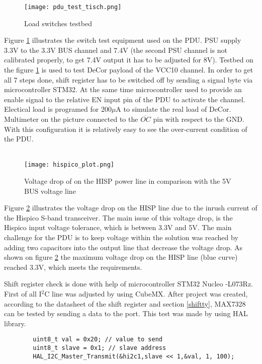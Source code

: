 \begin{figure}[h]
 	\centering
 	\texttt{[image: pdu\_test\_tisch.png]}
 	\caption{Load switches testbed}
 	\label{fig: pdu_test_tisch}
 \end{figure}

Figure \ref{fig: pdu_test_tisch} illustrates the switch test equipment used on the PDU. PSU supply 3.3V to the 3.3V BUS channel and 7.4V (the second PSU channel is not calibrated properly, to get 7.4V output it has to be adjusted for 8V). Testbed on the figure \ref{fig: pdu_test_tisch} is used to test DeCor payload of the VCC10 channel. In order to get all 7 steps done, shift register has to be switched off by sending a signal byte via microcontroller STM32. At the same time microcontroller used to provide an enable signal to the relative EN input pin of the PDU to activate the channel. Electical load is programed for 200$\mu$A to simulate the real load of DeCor. Multimeter on the picture connected to the $\overline{OC}$ pin with respect to the GND. With this configuration it is relatively easy to see the over-current condition of the PDU.\\ \\


 \begin{figure}[h]
 	\centering
 	\texttt{[image: hispico\_plot.png]}
 	\caption{Voltage drop of on the HISP power line in comparison with the 5V BUS voltage line}
 	\label{fig: oscilloscope}
 \end{figure}

Figure \ref{fig: oscilloscope} illustrates the voltage drop on the HISP line due to the inrush current of the Hispico S-band transceiver. The main issue of this voltage drop, is the Hispico input voltage tolerance, which is between 3.3V and 5V. The main challenge for the PDU is to keep voltage within the solution was reached by adding two capacitors into the output line that decrease the voltage drop. As shown on figure \ref{fig: oscilloscope} the maximum voltage drop on the HISP line (blue curve) reached 3.3V, which meets the requirements.

	
		
		Shift register check is done with help of microcontroller STM32 Nucleo -L073Rz. First of all I$^2$C line was adjusted by using CubeMX. After project was created, according to the datasheet of the shift register and section \ref{shiftty}, MAX7328 can be tested by sending a data to the port. This test was made by using HAL library.\\
		\begin{lstlisting}
		uint8_t val = 0x20; // value to send
		uint8_t slave = 0x1; // slave address
		HAL_I2C_Master_Transmit(&hi2c1,slave << 1,&val, 1, 100);
		\end{lstlisting}
	
